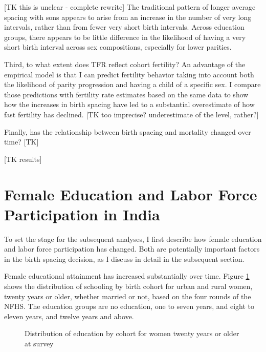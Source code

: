 \documentclass[12pt,letterpaper]{article}
\begin{document}
[TK this is unclear - complete rewrite]
The traditional pattern of longer average spacing with sons appears to arise from 
an increase in the number of very long intervals, rather than from fewer very short 
birth intervals. 
Across education groups, there appears to be little difference in the likelihood of 
having a very short birth interval across sex compositions, especially for lower parities.

Third, to what extent does TFR reflect cohort fertility?
An advantage of the empirical model is that I can predict fertility behavior taking into
account both the likelihood of parity progression and having a child of a specific sex.
I compare those predictions with fertility rate estimates based on the same data to
show how the increases in birth spacing have led to a substantial overestimate of how 
fast fertility has declined. [TK too imprecise? underestimate of the level, rather?]

Finally, has the relationship between birth spacing and mortality changed over time?
[TK]

[TK results]





\section{Female Education and Labor Force Participation in India}

To set the stage for the subsequent analyses, I first describe how female education
and labor force participation has changed.
Both are potentially important factors in the birth spacing decision, as I discuss
in detail in the subsequent section.

Female educational attainment has increased substantially over time.
Figure \ref{fig:education_over_time} shows the distribution of schooling by birth 
cohort for urban and rural women, 
twenty years or older, whether married or not, based on the four rounds of the NFHS.
The education groups are no education, one to seven years, and eight to eleven years,
and twelve years and above.

\begin{figure}[htpb]
\centering
{} 
\caption{Distribution of education by cohort for women twenty years or older at survey}
\label{fig:education_over_time}
\end{figure}
\end{document}
